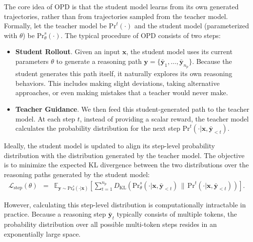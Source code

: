 The core idea of OPD is that the student model learns from its own generated trajectories, rather than from trajectories sampled from the teacher model. Formally, let the teacher model be $\mathrm{Pr}^{t}(\cdot)$ and the student model (parameterized with $\theta$) be $\mathrm{Pr}_{\theta}^{s}(\cdot)$. The typical procedure of OPD consists of two steps:

\begin{itemize}
\item \vspace{0.5em} \textbf{Student Rollout}. Given an input $\mathbf{x}$, the student model uses its current parameters $\theta$ to generate a reasoning path $\mathbf{y} = \{\bar{\mathbf{y}}_1, \dots, \bar{\mathbf{y}}_{n_p}\}$. Because the student generates this path itself, it naturally explores its own reasoning behaviors. This includes making slight deviations, taking alternative approaches, or even making mistakes that a teacher would never make.
\item \vspace{0.3em} \textbf{Teacher Guidance}. We then feed this student-generated path to the teacher model. At each step $t$, instead of providing a scalar reward, the teacher model calculates the probability distribution for the next step $\mathrm{Pr}^{t}(\cdot | \mathbf{x}, \bar{\mathbf{y}}_{<t})$.
\end{itemize}
\vspace{0.5em}

Ideally, the student model is updated to align its step-level probability distribution with the distribution generated by the teacher model. The objective is to minimize the expected KL divergence between the two distributions over the reasoning paths generated by the student model:
\begin{eqnarray}\mathcal{L}_{\mathrm{step}}(\theta) & = & \mathbb{E}_{\mathbf{y} \sim \mathrm{Pr}_{\theta}^{s}(\cdot|\mathbf{x})} \left[ \sum_{t=1}^{n_p} D_{\mathrm{KL}} \left( \mathrm{Pr}_{\theta}^{s}(\cdot | \mathbf{x}, \bar{\mathbf{y}}_{<t}) \,\|\, \mathrm{Pr}^{t}(\cdot | \mathbf{x}, \bar{\mathbf{y}}_{<t}) \right) \right].
\end{eqnarray}

\noindent However, calculating this step-level distribution is computationally intractable in practice. Because a reasoning step $\bar{\mathbf{y}}_t$ typically consists of multiple tokens, the probability distribution over all possible multi-token steps resides in an exponentially large space.

